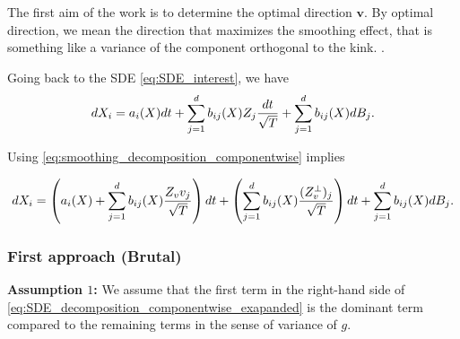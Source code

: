 The first aim of the work is to determine the optimal direction $\mathbf{v}$. By optimal direction, we mean the direction that maximizes the smoothing effect, that is something like a variance of the component orthogonal to the kink. .




Going back to the SDE \eqref{eq:SDE_interest}, we have 
\begin{equation}
dX_i=a_i(X) dt +\sum_{j=1}^d b_{ij}(X) Z_j \frac{dt}{\sqrt{T}}+\sum_{j=1}^d b_{ij}(X) dB_j .
\end{equation}

Using \eqref{eq:smoothing_decomposition_componentwise} implies

\begin{equation}\label{eq:SDE_decomposition_componentwise_exapanded}
dX_i=\left(a_i(X)+\sum_{j=1}^d b_{ij}(X)  \frac{Z_v v_j}{\sqrt{T}}\right) dt+\left(\sum_{j=1}^d b_{ij}(X) \frac{(Z_v^\perp)_j}{\sqrt{T}}\right) dt +\sum_{j=1}^d b_{ij}(X) dB_j .
\end{equation}

\subsubsection{First approach (Brutal)}

\textbf{Assumption $1$:} We assume that the first term in the right-hand side of \eqref{eq:SDE_decomposition_componentwise_exapanded}  is the dominant term compared to the remaining terms in the sense of variance of $g$.



